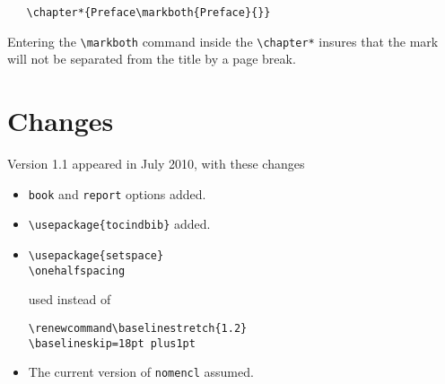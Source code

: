 \documentclass{article}
\begin{document}
\begin{itemize}
\begin{verbatim}
   \chapter*{Preface\markboth{Preface}{}}
\end{verbatim}
      Entering the \verb|\markboth| command inside the \verb|\chapter*| insures that the mark will not be separated from the title by a page break.
\end{itemize}

\section{Changes}
Version 1.1 appeared in July 2010, with these changes 
\begin{itemize}
\item \texttt{book} and \texttt{report} options added.

\item \verb|\usepackage{tocindbib}| added.

\item
\begin{verbatim}
\usepackage{setspace}
\onehalfspacing
\end{verbatim}
used instead of 
\begin{verbatim}
\renewcommand\baselinestretch{1.2}
\baselineskip=18pt plus1pt
\end{verbatim}

\item The current version of \texttt{nomencl} assumed.
\end{itemize}
\end{document}
